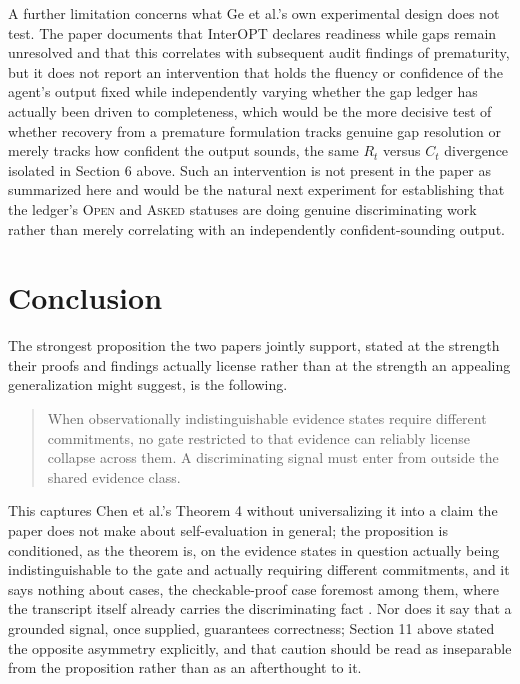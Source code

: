 \documentclass[11pt]{article}
\begin{document}
A further limitation concerns what Ge et al.'s own experimental design does not test. The paper documents that InterOPT declares readiness while gaps remain unresolved and that this correlates with subsequent audit findings of prematurity, but it does not report an intervention that holds the fluency or confidence of the agent's output fixed while independently varying whether the gap ledger has actually been driven to completeness, which would be the more decisive test of whether recovery from a premature formulation tracks genuine gap resolution or merely tracks how confident the output sounds, the same $R_t$ versus $C_t$ divergence isolated in Section 6 above. Such an intervention is not present in the paper as summarized here and would be the natural next experiment for establishing that the ledger's \textsc{Open} and \textsc{Asked} statuses are doing genuine discriminating work rather than merely correlating with an independently confident-sounding output.

\section{Conclusion}

The strongest proposition the two papers jointly support, stated at the strength their proofs and findings actually license rather than at the strength an appealing generalization might suggest, is the following.

\begin{quote}
When observationally indistinguishable evidence states require different commitments, no gate restricted to that evidence can reliably license collapse across them. A discriminating signal must enter from outside the shared evidence class.
\end{quote}

This captures Chen et al.'s Theorem 4 without universalizing it into a claim the paper does not make about self-evaluation in general; the proposition is conditioned, as the theorem is, on the evidence states in question actually being indistinguishable to the gate and actually requiring different commitments, and it says nothing about cases, the checkable-proof case foremost among them, where the transcript itself already carries the discriminating fact \cite{chen2026bilevel}. Nor does it say that a grounded signal, once supplied, guarantees correctness; Section 11 above stated the opposite asymmetry explicitly, and that caution should be read as inseparable from the proposition rather than as an afterthought to it.
\end{document}
